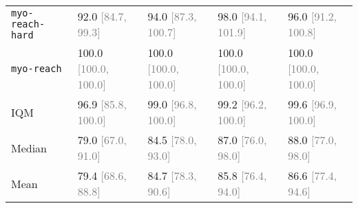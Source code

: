 \begin{table}[h]
{{\begin{tabular}{lllll}
\texttt{myo-reach-hard} & 92.0 \textcolor{gray}{[84.7, 99.3]} & 94.0 \textcolor{gray}{[87.3, 100.7]} & 98.0 \textcolor{gray}{[94.1, 101.9]} & 96.0 \textcolor{gray}{[91.2, 100.8]} \\
\texttt{myo-reach} & 100.0 \textcolor{gray}{[100.0, 100.0]} & 100.0 \textcolor{gray}{[100.0, 100.0]} & 100.0 \textcolor{gray}{[100.0, 100.0]} & 100.0 \textcolor{gray}{[100.0, 100.0]} \\ \midrule
IQM & 96.9 \textcolor{gray}{[85.8, 100.0]} & 99.0 \textcolor{gray}{[96.8, 100.0]} & 99.2 \textcolor{gray}{[96.2, 100.0]} & 99.6 \textcolor{gray}{[96.9, 100.0]} \\
Median & 79.0 \textcolor{gray}{[67.0, 91.0]} & 84.5 \textcolor{gray}{[78.0, 93.0]} & 87.0 \textcolor{gray}{[76.0, 98.0]} & 88.0 \textcolor{gray}{[77.0, 98.0]} \\
Mean & 79.4 \textcolor{gray}{[68.6, 88.8]} & 84.7 \textcolor{gray}{[78.3, 90.6]} & 85.8 \textcolor{gray}{[76.4, 94.0]} & 86.6 \textcolor{gray}{[77.4, 94.6]} \\
\bottomrule
\end{tabular}
}
}
\vspace{-0.1in}
\end{table}